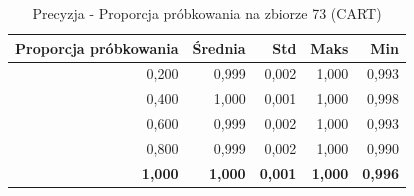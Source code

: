 \begin{table}[htbp]
\centering
\small
\setlength{\tabcolsep}{6pt}
\renewcommand{\arraystretch}{1.2}
\caption{Precyzja - Proporcja próbkowania na zbiorze 73 (CART)}
\label{tab:CART_sample_ratio_73_precision}
\begin{tabular}{r|r|r|r|r}
\toprule
Proporcja próbkowania & Średnia & Std & Maks & Min \\
\hline
0,200 & 0,999 & 0,002 & 1,000 & 0,993 \\
0,400 & 1,000 & 0,001 & 1,000 & 0,998 \\
0,600 & 0,999 & 0,002 & 1,000 & 0,993 \\
0,800 & 0,999 & 0,002 & 1,000 & 0,990 \\
\textbf{1,000} & \textbf{1,000} & \textbf{0,001} & \textbf{1,000} & \textbf{0,996} \\
\bottomrule
\end{tabular}
\end{table}